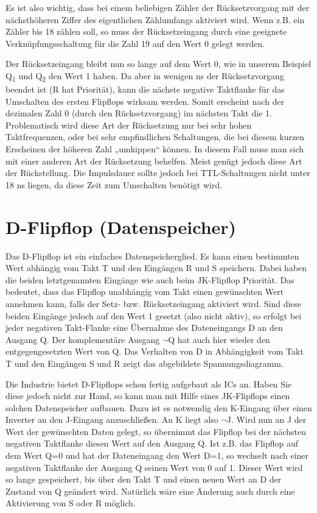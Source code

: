 Es ist also wichtig, dass bei einem beliebigen Zähler der Rücksetzvorgang mit der nächsthöheren Ziffer des eigentlichen Zählumfangs aktiviert wird. Wenn z.B. ein Zähler bis 18 zählen soll, so muss der Rücksetzeingang durch eine geeignete Verknüpfungsschaltung für die Zahl 19 auf den Wert 0 gelegt werden.

Der Rücksetzeingang bleibt nun so lange auf dem Wert 0, wie in unserem Beispiel Q\textsubscript{1} und Q\textsubscript{2} den Wert 1 haben. Da aber in wenigen ns der Rücksetzvorgang beendet ist (R hat Priorität), kann die nächste negative Taktflanke für das Umschalten des ersten Flipflops wirksam werden. Somit erscheint nach der dezimalen Zahl 0 (durch den Rücksetzvorgang) im nächsten Takt die 1. Problematisch wird diese Art der Rücksetzung nur bei sehr hohen Taktfrequenzen, oder bei sehr empfindlichen Schaltungen, die bei diesem kurzen Erscheinen der höheren Zahl „umkippen“ können. In diesem Fall muss man sich mit einer anderen Art der Rücksetzung behelfen. Meist genügt jedoch diese Art der Rückstellung. Die Impulsdauer sollte jedoch bei TTL-Schaltungen nicht unter 18 ns liegen, da diese Zeit zum Umschalten benötigt wird.

\section{D-Flipflop (Datenspeicher)}

Das D-Flipflop ist ein einfaches Datenspeicherglied. Es kann einen bestimmten Wert abhängig vom Takt T und den Eingängen R und S speichern. Dabei haben die beiden letztgenannten Eingänge wie auch beim JK-Flipflop Priorität. Das bedeutet, dass das Flipflop unabhängig vom Takt einen gewünschten Wert annehmen kann, falls der Setz- bzw. Rücksetzeingang aktiviert wird. Sind diese beiden Eingänge jedoch auf den Wert 1 gesetzt (also nicht aktiv), so erfolgt bei jeder negativen Takt-Flanke eine Übernahme des Dateneingangs D an den Ausgang Q. Der komplementäre Ausgang \ensuremath{\lnot}Q hat auch hier wieder den entgegengesetzten Wert von Q. Das Verhalten von D in Abhängigkeit vom Takt T und den Eingängen S und R zeigt das abgebildete Spannungsdiagramm. 

Die Industrie bietet D-Flipflops schon fertig aufgebaut als ICs an. Haben Sie diese jedoch nicht zur Hand, so kann man mit Hilfe eines JK-Flipflops einen solchen Datenspeicher aufbauen. Dazu ist es notwendig den K-Eingang über einen Inverter an den J-Eingang anzuschließen. An K liegt also \ensuremath{\lnot}J. Wird nun an J der Wert der gewünschten Daten gelegt, so übernimmt das Flipflop bei der nächsten negativen Taktflanke diesen Wert auf den Ausgang Q. Ist z.B. das Flipflop auf dem Wert Q=0 und hat der Dateneingang den Wert D=1, so wechselt nach einer negativen Taktflanke der Ausgang Q seinen Wert von 0 auf 1. Dieser Wert wird so lange gespeichert, bis über den Takt T und einen neuen Wert an D der Zustand von Q geändert wird. Natürlich wäre eine Änderung auch durch eine Aktivierung von S oder R möglich.

